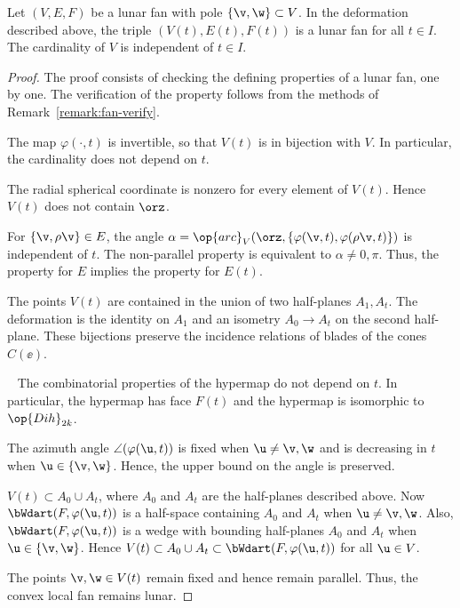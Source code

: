 \begin{lemma}[]\label{lemma:lunar-deform} 
Let $(V,E,F)$ be a lunar fan with pole $\{\v,\w\}\subset V$.  In
the deformation described above, the triple $(V(t),E(t),F(t))$ is a
lunar fan for all $t\in I$.  The cardinality of $V$ is
independent of $t\in I$.
\end{lemma}

\begin{proof} The proof consists of checking the defining properties of a lunar fan, 
one by one.  The verification of the property 
follows from the methods of Remark~\ref{remark:fan-verify}.

The map $\varphi(\cdot,t)$ is invertible, so that $V(t)$ is in
bijection with $V$.  In particular, the cardinality does not depend
on $t$.

 The radial spherical coordinate is nonzero for every
element of $V(t)$.  Hence $V(t)$ does not contain $\orz$.

 For $\{\v,\rho \v\}\in E$, the angle
$\alpha=\op{arc}_V(\orz,\{\varphi(\v,t),\varphi(\rho \v,t)\})$ is
independent of $t$.  The non-parallel property is equivalent to
$\alpha\ne0,\pi$.  Thus, the  property for $E$ implies
the property for $E(t)$.

 The points $V(t)$ are contained in the union of
two half-planes $A_1,A_t$.  The deformation is the identity on $A_1$
and an isometry $A_0\to A_t$ on the second half-plane.  These
bijections preserve the incidence relations of blades of the cones
$C(\ee)$.

~ The combinatorial properties of
the hypermap do not depend on $t$.  In particular, the hypermap has
face $F(t)$ and the hypermap is isomorphic to $\op{Dih}_{2k}$.

 The azimuth angle $\angle(\varphi(\u,t))$ is fixed when
$\u\ne \v,\w$ and is decreasing in $t$ when $\u\in \{\v,\w\}$.
Hence, the upper bound on the angle is preserved.

 $V(t)\subset A_0\cup A_t$, where $A_0$ and $A_t$ are
the half-planes described above.  Now $\bWdart(F,\varphi(\u,t))$ is
a half-space containing $A_0$ and $A_t$ when $\u\ne \v,\w$.  Also,
$\bWdart(F,\varphi(\u,t))$ is a wedge with bounding half-planes
$A_0$ and $A_t$ when $\u\in \{\v,\w\}$.  Hence $V(t)\subset A_0\cup
A_t\subset \bWdart(F,\varphi(\u,t))$ for all $\u\in V$.

 The points $\v,\w\in V(t)$ remain fixed and hence
remain parallel.  Thus, the convex local fan remains lunar.
\end{proof}
%

